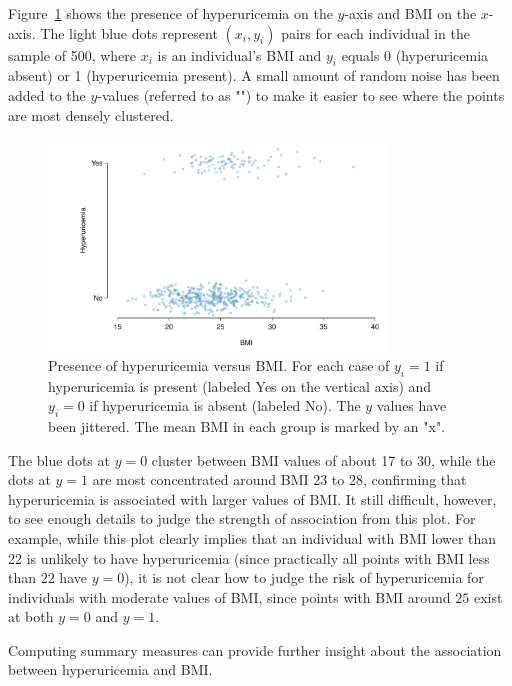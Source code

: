 Figure~\ref{figure:bmiHuProbSecondTileDataOnly} shows the presence  of hyperuricemia on the $y$-axis and BMI on the $x$-axis. The light blue dots represent $(x_i, y_i)$ pairs for each individual in the sample of 500, where $x_i$ is an individual's BMI and $y_i$ equals 0 (hyperuricemia absent) or 1 (hyperuricemia present). A small amount of random noise has been added to the $y$-values (referred to as "") to make it easier to see where the points are most densely clustered.
        
     \begin{figure}[h!]
        \centering
        \includegraphics[width=0.80\textwidth]
        {ch_logistic_regression_oi_biostat/figures/bmiHuProbSecondTile/bmiHuProbSecondTileDataOnly.pdf}
         \caption{Presence of hyperuricemia versus BMI. For each case of $y_i = 1$ if hyperuricemia is present (labeled Yes on the vertical axis) and $y_i = 0$ if hyperuricemia is absent (labeled No). The $y$ values have been jittered. The mean BMI in each group is marked by an "x".}
         \label{figure:bmiHuProbSecondTileDataOnly}
     \end{figure}

The blue dots at $y = 0$ cluster between BMI values of about 17 to 30, while the dots at $y = 1$ are most concentrated around BMI 23 to 28, confirming that  hyperuricemia is associated with larger values of BMI. It still difficult, however, to see enough details to judge the strength of association from this plot. For example, while this plot clearly implies that an individual with BMI lower than 22 is unlikely to have hyperuricemia (since practically all points with BMI less than $22$ have $y = 0$), it is not clear how to judge the risk of hyperuricemia for individuals with moderate values of BMI, since points with BMI around $25$ exist at both $y = 0$ and $y = 1$.

Computing summary measures can provide further insight about the association between hyperuricemia and BMI.

